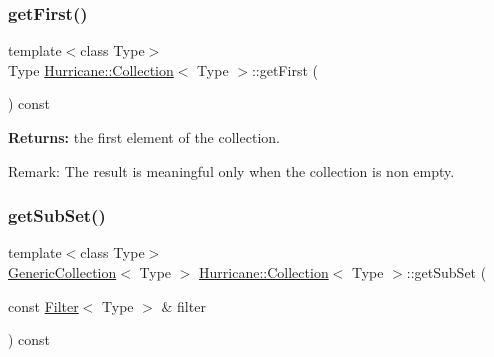 \mbox{\label{classHurricane_1_1Collection_a846a042646e02a0f77d2ce0f6190288a}} 
\subsubsection{\texorpdfstring{get\+First()}{getFirst()}}
{\footnotesize\ttfamily template$<$class Type$>$ \\
Type \hyperlink{classHurricane_1_1Collection}{Hurricane\+::\+Collection}$<$ Type $>$\+::get\+First (\begin{DoxyParamCaption}{ }\end{DoxyParamCaption}) const\hspace{0.3cm}{\ttfamily [inline]}}

{\bfseries Returns\+:} the first element of the collection.

\begin{DoxyParagraph}{Remark\+:}
The result is meaningful only when the collection is non empty. 
\end{DoxyParagraph}
\mbox{\label{classHurricane_1_1Collection_aa32ea7249d57ee05e3c71dcde8106832}} 
\subsubsection{\texorpdfstring{get\+Sub\+Set()}{getSubSet()}\hspace{0.1cm}{\footnotesize\ttfamily [1/3]}}
{\footnotesize\ttfamily template$<$class Type$>$ \\
\hyperlink{classHurricane_1_1GenericCollection}{Generic\+Collection}$<$ Type $>$ \hyperlink{classHurricane_1_1Collection}{Hurricane\+::\+Collection}$<$ Type $>$\+::get\+Sub\+Set (\begin{DoxyParamCaption}\item[{const \hyperlink{classHurricane_1_1Filter}{Filter}$<$ Type $>$ \&}]{filter }\end{DoxyParamCaption}) const\hspace{0.3cm}{\ttfamily [inline]}}

